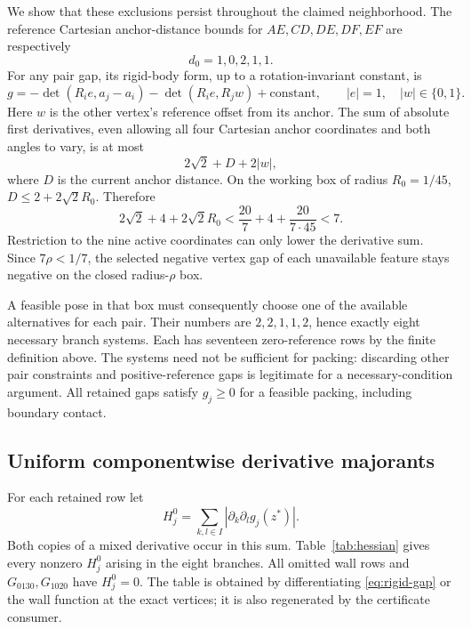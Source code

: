 \documentclass[11pt]{article}
\begin{document}
We show that these exclusions persist throughout the claimed neighborhood. The reference Cartesian anchor-distance bounds for $AE,CD,DE,DF,EF$ are respectively
\begin{equation}\label{eq:anchor-bounds}
 d_0=1,0,2,1,1.
\end{equation}
For any pair gap, its rigid-body form, up to a rotation-invariant constant, is
\begin{equation}\label{eq:rigid-gap}
 g=-\det(R_i e,a_j-a_i)-\det(R_i e,R_jw)+\text{constant},
 \qquad |e|=1,\quad |w|\in\{0,1\}.
\end{equation}
Here $w$ is the other vertex's reference offset from its anchor. The sum of absolute first derivatives, even allowing all four Cartesian anchor coordinates and both angles to vary, is at most
\[
 2\sqrt2+D+2|w|,
\]
where $D$ is the current anchor distance. On the working box of radius $R_0=1/45$, $D\le2+2\sqrt2R_0$. Therefore
\begin{equation}\label{eq:gradient-seven}
 2\sqrt2+4+2\sqrt2R_0
 <\frac{20}7+4+\frac{20}{7\cdot45}<7.
\end{equation}
Restriction to the nine active coordinates can only lower the derivative sum. Since $7\rho<1/7$, the selected negative vertex gap of each unavailable feature stays negative on the closed radius-$\rho$ box.

A feasible pose in that box must consequently choose one of the available alternatives for each pair. Their numbers are $2,2,1,1,2$, hence exactly eight necessary branch systems. Each has seventeen zero-reference rows by the finite definition above. The systems need not be sufficient for packing: discarding other pair constraints and positive-reference gaps is legitimate for a necessary-condition argument. All retained gaps satisfy $g_j\ge0$ for a feasible packing, including boundary contact.

\subsection{Uniform componentwise derivative majorants}

For each retained row let
\[
 H_j^0=\sum_{k,l\in I}|\partial_k\partial_lg_j(z^*)|.
\]
Both copies of a mixed derivative occur in this sum. Table~\ref{tab:hessian} gives every nonzero $H_j^0$ arising in the eight branches. All omitted wall rows and $G_{0130},G_{1020}$ have $H_j^0=0$. The table is obtained by differentiating \eqref{eq:rigid-gap} or the wall function at the exact vertices; it is also regenerated by the certificate consumer.
\end{document}
